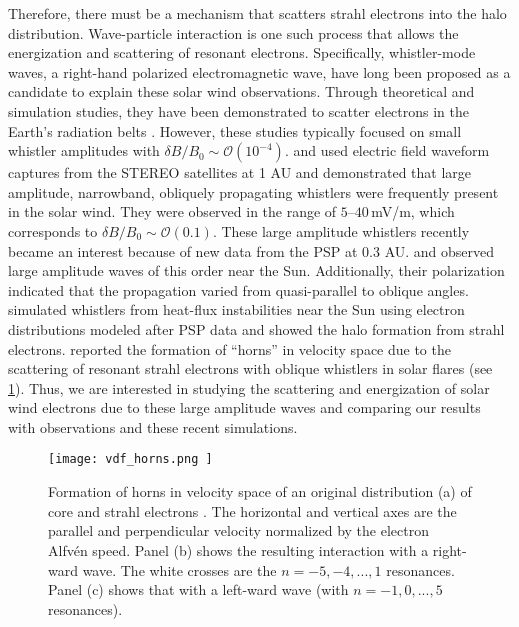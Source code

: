 Therefore, there must be a mechanism that scatters strahl
electrons into the halo distribution. Wave-particle interaction is one such
process that allows the energization and scattering of resonant electrons.
Specifically, whistler-mode waves, a right-hand polarized electromagnetic wave,
have long been proposed as a candidate to explain these solar wind observations.
Through theoretical and simulation studies, they have been demonstrated to
scatter electrons in the Earth's radiation belts \citep[][and references
therein]{Karimabadi1990,Albert1993,Tao&Bortnik2010,Hsieh2017}. However,
these studies typically focused on small whistler amplitudes with $\delta
B/B_0\sim\mathcal{O}(10^{-4})$. \cite{Breneman2010} and \cite{Cattell2020} used
electric field waveform captures from the STEREO satellites at 1 AU and
demonstrated that large amplitude, narrowband, obliquely propagating whistlers
were frequently present in the solar wind. They were observed in the range of
$5$--$40$\,\si{mV/m}, which corresponds to $\delta B/B_0\sim\mathcal{O}(0.1)$.
These large amplitude whistlers recently became an interest because of
new data from the PSP at 0.3 AU. \cite{Agapitov2020} and \cite{Cattell2021} 
observed large amplitude waves of this order near the Sun. Additionally, their
polarization indicated that the propagation varied from quasi-parallel to
oblique angles. \cite{Micera2020} simulated whistlers from heat-flux
instabilities near the Sun using electron distributions modeled after PSP
data and showed the halo formation from strahl electrons. \cite{RobergClark2019} reported the formation of ``horns'' in
velocity space due to the scattering of resonant strahl electrons with oblique
whistlers in solar flares (see \cref{fig:vdf_horns}). Thus, we are interested in
studying the scattering and energization of solar wind electrons due to these
large amplitude waves and comparing our results with observations and these recent simulations.

\begin{figure}
    \centering
    \texttt{[image: vdf\_horns.png ]}
    \caption{Formation of horns in velocity space of an
        original distribution (a) of core and strahl
        electrons \citep{RobergClark2019}. The horizontal and vertical axes are
    the parallel and perpendicular velocity normalized by the electron Alfvén
    speed. Panel (b) shows the resulting interaction with a right-ward wave.
The white crosses are the $n=-5,-4,...,1$ resonances. Panel (c) shows that with
a left-ward wave (with $n=-1,0,...,5$ resonances).}
    \label{fig:vdf_horns}
\end{figure}


